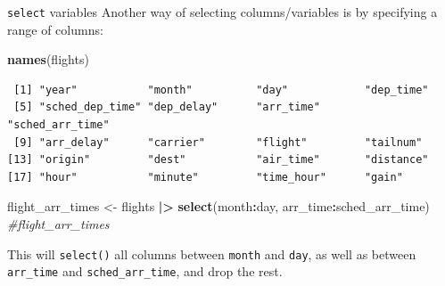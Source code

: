 \documentclass[
  ignorenonframetext,
]{beamer}
\newenvironment{Shaded}{\begin{snugshade}}{\end{snugshade}}
\newcommand{\CommentTok}[1]{\textcolor[rgb]{0.56,0.35,0.01}{\textit{#1}}}
\newcommand{\FunctionTok}[1]{\textcolor[rgb]{0.13,0.29,0.53}{\textbf{#1}}}
\newcommand{\NormalTok}[1]{#1}
\newcommand{\OtherTok}[1]{\textcolor[rgb]{0.56,0.35,0.01}{#1}}
\newcommand{\SpecialCharTok}[1]{\textcolor[rgb]{0.81,0.36,0.00}{\textbf{#1}}}
\begin{document}
\begin{frame}[fragile]{\texttt{select} variables}
\protect\hypertarget{select-variables-2}{}
Another way of selecting columns/variables is by specifying a range of
columns:

\small

\begin{Shaded}
\begin{Highlighting}[]
\FunctionTok{names}\NormalTok{(flights)}
\end{Highlighting}
\end{Shaded}

\begin{verbatim}
 [1] "year"           "month"          "day"            "dep_time"      
 [5] "sched_dep_time" "dep_delay"      "arr_time"       "sched_arr_time"
 [9] "arr_delay"      "carrier"        "flight"         "tailnum"       
[13] "origin"         "dest"           "air_time"       "distance"      
[17] "hour"           "minute"         "time_hour"      "gain"          
\end{verbatim}

\begin{Shaded}
\begin{Highlighting}[]
\NormalTok{flight\_arr\_times }\OtherTok{\textless{}{-}}\NormalTok{ flights }\SpecialCharTok{|\textgreater{}} 
  \FunctionTok{select}\NormalTok{(month}\SpecialCharTok{:}\NormalTok{day, arr\_time}\SpecialCharTok{:}\NormalTok{sched\_arr\_time)}
\CommentTok{\#flight\_arr\_times}
\end{Highlighting}
\end{Shaded}

\normalsize

This will \texttt{select()} all columns between \texttt{month} and
\texttt{day}, as well as between \texttt{arr\_time} and
\texttt{sched\_arr\_time}, and drop the rest.
\end{frame}
\end{document}
